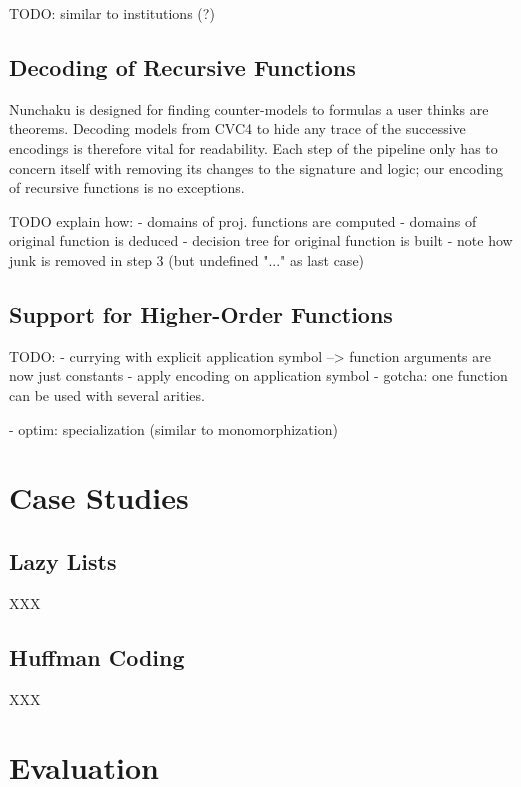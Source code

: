 TODO: similar to institutions \cite{goguen-meseguer} (?)

\subsection{Decoding of Recursive Functions}

Nunchaku is designed for finding counter-models to formulas a user thinks
are theorems. Decoding models from CVC4 to hide any trace of the successive
encodings is therefore vital for readability. Each step
of the pipeline only has to concern itself with removing its changes to
the signature and logic; our encoding of recursive functions is no exceptions.

TODO explain how:
- domains of proj. functions are computed
- domains of original function is deduced
- decision tree for original function is built
- note how junk is removed in step 3 (but undefined "..." as last case)

\subsection{Support for Higher-Order Functions}

TODO:
- currying with explicit application symbol --> function arguments are now
  just constants
- apply encoding on application symbol
- gotcha: one function can be used with several arities.

- optim: specialization (similar to monomorphization)

\section{Case Studies}
\label{sec:case-studies}

\subsection{Lazy Lists}

XXX

\subsection{Huffman Coding}

XXX

\section{Evaluation}
\label{sec:evaluation}

